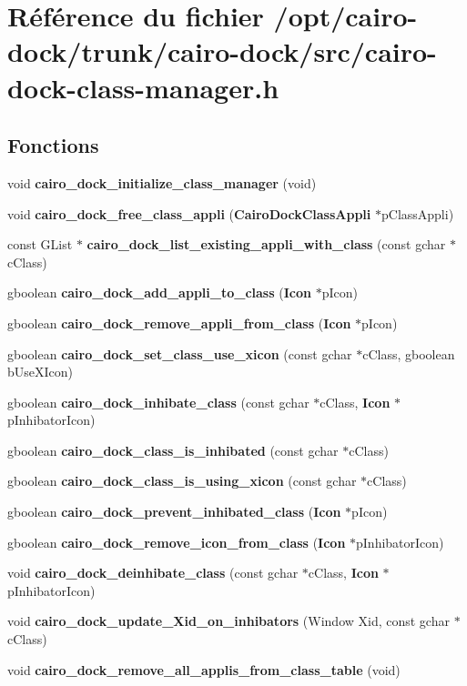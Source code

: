 \section{Référence du fichier /opt/cairo-dock/trunk/cairo-dock/src/cairo-dock-class-manager.h}
\label{cairo-dock-class-manager_8h}
\subsection*{Fonctions}
\begin{CompactItemize}
\item 
void {\bf cairo\_\-dock\_\-initialize\_\-class\_\-manager} (void)
\item 
void {\bf cairo\_\-dock\_\-free\_\-class\_\-appli} ({\bf CairoDockClassAppli} $\ast$pClassAppli)
\item 
const GList $\ast$ {\bf cairo\_\-dock\_\-list\_\-existing\_\-appli\_\-with\_\-class} (const gchar $\ast$cClass)
\item 
gboolean {\bf cairo\_\-dock\_\-add\_\-appli\_\-to\_\-class} ({\bf Icon} $\ast$pIcon)
\item 
gboolean {\bf cairo\_\-dock\_\-remove\_\-appli\_\-from\_\-class} ({\bf Icon} $\ast$pIcon)
\item 
gboolean {\bf cairo\_\-dock\_\-set\_\-class\_\-use\_\-xicon} (const gchar $\ast$cClass, gboolean bUseXIcon)
\item 
gboolean {\bf cairo\_\-dock\_\-inhibate\_\-class} (const gchar $\ast$cClass, {\bf Icon} $\ast$pInhibatorIcon)
\item 
gboolean {\bf cairo\_\-dock\_\-class\_\-is\_\-inhibated} (const gchar $\ast$cClass)
\item 
gboolean {\bf cairo\_\-dock\_\-class\_\-is\_\-using\_\-xicon} (const gchar $\ast$cClass)
\item 
gboolean {\bf cairo\_\-dock\_\-prevent\_\-inhibated\_\-class} ({\bf Icon} $\ast$pIcon)
\item 
gboolean {\bf cairo\_\-dock\_\-remove\_\-icon\_\-from\_\-class} ({\bf Icon} $\ast$pInhibatorIcon)
\item 
void {\bf cairo\_\-dock\_\-deinhibate\_\-class} (const gchar $\ast$cClass, {\bf Icon} $\ast$pInhibatorIcon)
\item 
void {\bf cairo\_\-dock\_\-update\_\-Xid\_\-on\_\-inhibators} (Window Xid, const gchar $\ast$cClass)
\item 
void {\bf cairo\_\-dock\_\-remove\_\-all\_\-applis\_\-from\_\-class\_\-table} (void)

\end{CompactItemize}
